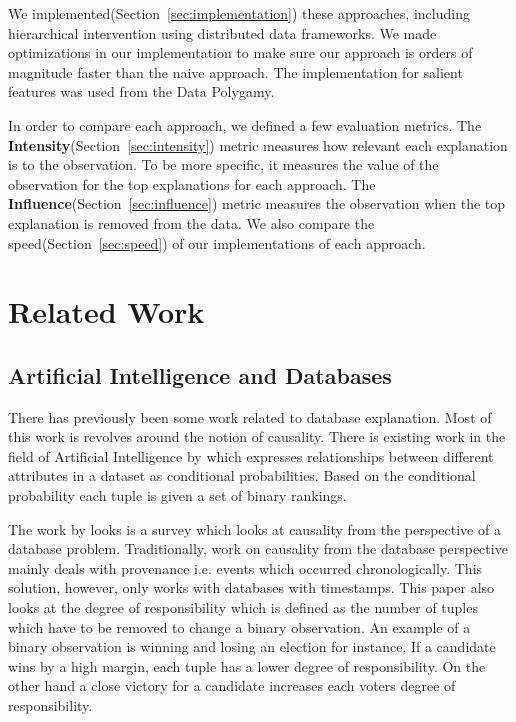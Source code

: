 We implemented(Section~\ref{sec:implementation}) these approaches, including hierarchical intervention using distributed data frameworks\citep{borthakur2007hadoop,dean2008mapreduce,shanahan2015large,zaharia2016apache}. We made optimizations in our implementation to make sure our approach is orders of magnitude faster than the naive approach. The implementation for salient features was used from the Data Polygamy.

In order to compare each approach, we defined a few evaluation metrics. The \textbf{Intensity}(Section~\ref{sec:intensity}) metric measures how relevant each explanation is to the observation. To be more specific, it measures the value of the observation for the top explanations for each approach. The \textbf{Influence}(Section~\ref{sec:influence}) metric measures the observation when the top explanation is removed from the data. We also compare the speed(Section~\ref{sec:speed}) of our implementations of each approach. 

\section{Related Work}
\subsection{Artificial Intelligence and Databases}
There has previously been some work related to database explanation. Most of this work is revolves around the notion of causality. There is existing work in the field of Artificial Intelligence by \cite{zhang2002discovering} which expresses relationships between different attributes in a dataset as conditional probabilities. Based on the conditional probability each tuple is given a set of binary rankings. 

The work by \cite{meliou2010causality} looks is a survey which looks at causality from the perspective of a database problem. Traditionally, work on causality from the database perspective mainly deals with provenance i.e. events which occurred chronologically. This solution, however, only works with databases with timestamps. This paper also looks at the degree of responsibility which is defined as the number of tuples which have to be removed to change a binary observation. An example of a binary observation is winning and losing an election for instance. If a candidate wins by a high margin, each tuple has a lower degree of responsibility. On the other hand a close victory for a candidate increases each voters degree of responsibility.

